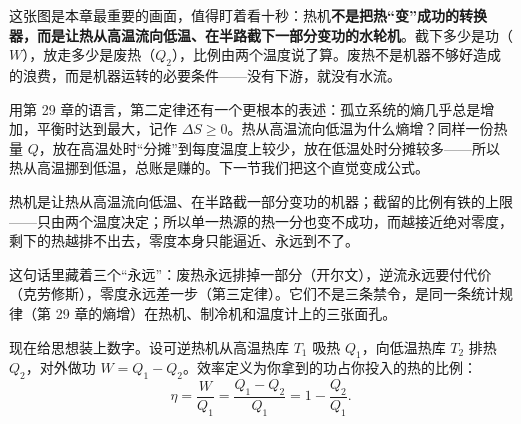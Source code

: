 \begin{center}
\end{center}

这张图是本章最重要的画面，值得盯着看十秒：热机\textbf{不是把热“变”成功的转换器，而是让热从高温流向低温、在半路截下一部分变功的水轮机}。截下多少是功（\(W\)），放走多少是废热（\(Q_2\)），比例由两个温度说了算。废热不是机器不够好造成的浪费，而是机器运转的必要条件——没有下游，就没有水流。

用第 29 章的语言，第二定律还有一个更根本的表述：孤立系统的熵几乎总是增加，平衡时达到最大，记作 \(\Delta S \geq 0\)。热从高温流向低温为什么熵增？同样一份热量 \(Q\)，放在高温处时“分摊”到每度温度上较少，放在低温处时分摊较多——所以热从高温挪到低温，总账是赚的。下一节我们把这个直觉变成公式。


\begin{oneline}
热机是让热从高温流向低温、在半路截一部分变功的机器；截留的比例有铁的上限——只由两个温度决定；所以单一热源的热一分也变不成功，而越接近绝对零度，剩下的热越排不出去，零度本身只能逼近、永远到不了。
\end{oneline}

这句话里藏着三个“永远”：废热永远排掉一部分（开尔文），逆流永远要付代价（克劳修斯），零度永远差一步（第三定律）。它们不是三条禁令，是同一条统计规律（第 29 章的熵增）在热机、制冷机和温度计上的三张面孔。


现在给思想装上数字。设可逆热机从高温热库 \(T_1\) 吸热 \(Q_1\)，向低温热库 \(T_2\) 排热 \(Q_2\)，对外做功 \(W=Q_1-Q_2\)。效率定义为你拿到的功占你投入的热的比例：
\[
\eta=\frac{W}{Q_1}=\frac{Q_1-Q_2}{Q_1}=1-\frac{Q_2}{Q_1}.
\]

